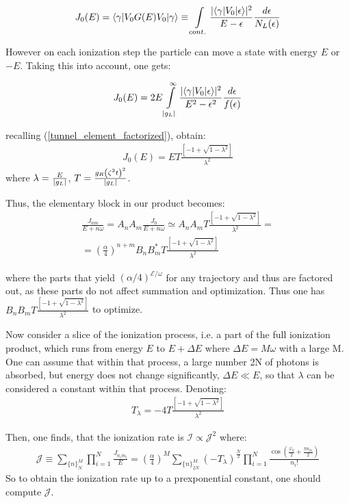 \begin{gather}
	J_{0}(E)=\langle\gamma|V_{0}G(E)V_{0}|\gamma\rangle\equiv\intop_{cont.}\frac{|\langle\gamma|V_{0}|\epsilon\rangle|^{2}}{E-\epsilon}\frac{d\epsilon}{N_L(\epsilon)}
\end{gather}

However on each ionization step  the particle can move a state with energy $ E $ or $ -E $. Taking this into account, one	 gets:

\begin{gather}
	J_{0}(E)
	=
	2E\intop_{|g_{L}|}^{\infty}\frac{|\langle\gamma|V_{0}|\epsilon\rangle|^{2}}{E^{2}-\epsilon^{2}}\frac{d\epsilon}{f(\epsilon)}
\end{gather}

recalling (\ref{tunnel_element_factorized}), obtain:
\begin{gather}
		J_{0}(E)
		=
		ET\frac{\left[-1+\sqrt{1-\lambda^{2}}\right]}{\lambda^{2}}
\end{gather}
where $ \lambda = \frac{E}{\left|g_L\right|} $, $ T=\frac{g_R\left(\zeta^2t\right)^2}{\left|g_L\right|} $.

Thus, the elementary block in our product becomes:
\begin{multline}
	\frac{J_{nm}}{E+n\omega}
	=
	A_{n}A_{m}\frac{J_{0}}{E+n\omega}\simeq A_{n}A_{m}T\frac{\left[-1+\sqrt{1-\lambda^{2}}\right]}{\lambda^{2}}
	=
	\\
	=\left(\frac{\alpha}{4}\right)^{n+m}B_{n}B_{m}^{*}T\frac{\left[-1+\sqrt{1-\lambda^{2}}\right]}{\lambda^{2}}
\end{multline}

where the parts that yield $ (\alpha/4)^{\mathcal{E}/\omega} $ for any trajectory and thus are factored out, as these parts do not affect summation and optimization. Thus one has $ B_{n}B_{m}T\frac{\left[-1+\sqrt{1-\lambda^{2}}\right]}{\lambda^{2}} $ to optimize.

Now consider a slice of the ionization process, i.e. a part of the full ionization product, which runs from energy $ E $ to $ E+\Delta E $ where $ \Delta E=M\omega $ with a large M. One can assume that within that process, a large number 2N of photons is absorbed, but energy does not change significantly, $ \Delta E\ll E $, so that $ \lambda $ can be considered a constant within that process. Denoting:
\begin{gather}
	T_{\lambda}=-4T\frac{\left[-1+\sqrt{1-\lambda^{2}}\right]}{\lambda^{2}}
\end{gather}

Then, one finds, that the ionization rate is $ \mathcal{I}\propto\mathcal{J}^2 $ where:
\begin{gather}
\label{ionization_super_formula}
\mathcal{J}
\equiv
\sum_{\{n\}_{N}^{M}}\prod_{i=1}^{N}\frac{J_{n_{i}m_{i}}}{E}=\left(\frac{\alpha}{4}\right)^{M}\sum_{\{n\}_{2N}^{M}}(-T_{\lambda})^{\frac{N}{2}}\prod_{i=1}^{N}\frac{\cos(\frac{\varphi_{0}}{2}+\frac{\pi n_{2i}}{2})}{n_{i}!}
\end{gather}
So to obtain the ionization rate up to a prexponential constant, one should compute $ \mathcal{J} $.

